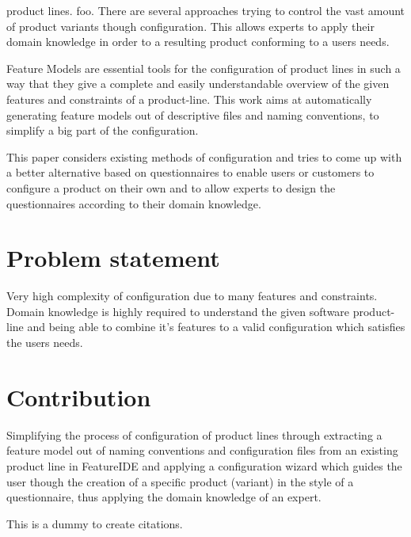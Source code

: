 % 
% 
% 
% 
 product lines. foo. There are several approaches trying to control the vast amount of product variants though configuration. This allows experts to apply their domain knowledge in order to a resulting product conforming to a users needs.

Feature Models are essential tools for the configuration of product lines in such a way that they give a complete and easily understandable overview of the given features and constraints of a product-line. This work aims at automatically generating feature models out of descriptive files and naming conventions, to simplify a big part of the configuration.

This paper considers existing methods of configuration and tries to come up with a better alternative based on questionnaires to enable users or customers to configure a product on their own and to allow experts to design the questionnaires according to their domain knowledge.

\section*{Problem statement}
Very high complexity of configuration due to many features and constraints. Domain knowledge is highly required to understand the given software product-line and being able to combine it's features to a valid configuration which satisfies the users needs.

\section*{Contribution}

Simplifying the process of configuration of product lines through extracting a feature model out of naming conventions and configuration files from an existing product line in FeatureIDE and applying a configuration wizard which guides the user though the creation of a specific product (variant) in the style of a questionnaire, thus applying the domain knowledge of an expert.

This\cite{fpe} is\cite{qdc} a\cite{qbvm} dummy\cite{fmgp} to create citations.